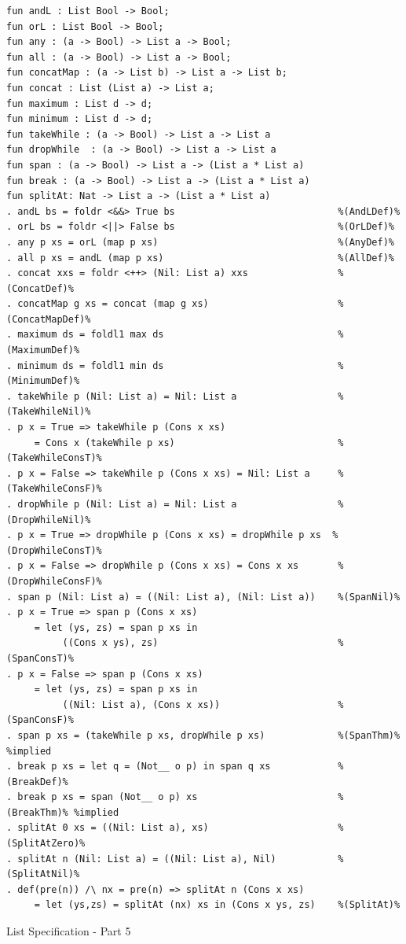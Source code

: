 \documentclass[12pt,twoside]{article}
\numberwithin{spec}{subsection}
\numberwithin{proof}{subsection}
\numberwithin{figure}{subsection}
\numberwithin{code}{subsection}
\begin{document}
\addtocounter{spec}{-1}
\begin{spec}
\begin{verbatim}
fun andL : List Bool -> Bool;
fun orL : List Bool -> Bool;
fun any : (a -> Bool) -> List a -> Bool;
fun all : (a -> Bool) -> List a -> Bool;
fun concatMap : (a -> List b) -> List a -> List b;
fun concat : List (List a) -> List a;
fun maximum : List d -> d;
fun minimum : List d -> d;
fun takeWhile : (a -> Bool) -> List a -> List a
fun dropWhile  : (a -> Bool) -> List a -> List a
fun span : (a -> Bool) -> List a -> (List a * List a)
fun break : (a -> Bool) -> List a -> (List a * List a)
fun splitAt: Nat -> List a -> (List a * List a)
. andL bs = foldr <&&> True bs                             %(AndLDef)%
. orL bs = foldr <||> False bs                             %(OrLDef)%
. any p xs = orL (map p xs)                                %(AnyDef)%
. all p xs = andL (map p xs)                               %(AllDef)%
. concat xxs = foldr <++> (Nil: List a) xxs                %(ConcatDef)%
. concatMap g xs = concat (map g xs)                       %(ConcatMapDef)%
. maximum ds = foldl1 max ds                               %(MaximumDef)%
. minimum ds = foldl1 min ds                               %(MinimumDef)%
. takeWhile p (Nil: List a) = Nil: List a                  %(TakeWhileNil)%
. p x = True => takeWhile p (Cons x xs) 
     = Cons x (takeWhile p xs)                             %(TakeWhileConsT)%
. p x = False => takeWhile p (Cons x xs) = Nil: List a     %(TakeWhileConsF)%
. dropWhile p (Nil: List a) = Nil: List a                  %(DropWhileNil)%
. p x = True => dropWhile p (Cons x xs) = dropWhile p xs  %(DropWhileConsT)%
. p x = False => dropWhile p (Cons x xs) = Cons x xs       %(DropWhileConsF)%
. span p (Nil: List a) = ((Nil: List a), (Nil: List a))    %(SpanNil)%
. p x = True => span p (Cons x xs) 
     = let (ys, zs) = span p xs in
          ((Cons x ys), zs)                                %(SpanConsT)%
. p x = False => span p (Cons x xs)
     = let (ys, zs) = span p xs in
          ((Nil: List a), (Cons x xs))                     %(SpanConsF)%
. span p xs = (takeWhile p xs, dropWhile p xs)             %(SpanThm)% %implied
. break p xs = let q = (Not__ o p) in span q xs            %(BreakDef)%
. break p xs = span (Not__ o p) xs                         %(BreakThm)% %implied
. splitAt 0 xs = ((Nil: List a), xs)                       %(SplitAtZero)%
. splitAt n (Nil: List a) = ((Nil: List a), Nil)           %(SplitAtNil)%
. def(pre(n)) /\ nx = pre(n) => splitAt n (Cons x xs)
     = let (ys,zs) = splitAt (nx) xs in (Cons x ys, zs)    %(SplitAt)%
\end{verbatim}
\caption{List Specification - Part 5}
\end{spec}
\end{document}
